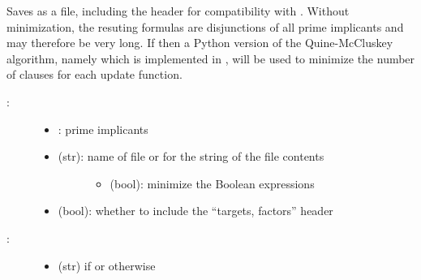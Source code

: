 \documentclass[letterpaper,10pt,english]{sphinxmanual}
\begin{document}
\begin{fulllineitems}
\label{\detokenize{FileExchange:PyBoolNet.FileExchange.primes2bnet}}
Saves  as a  file, including the header  for compatibility with {\hyperref[\detokenize{Installation:installation-boolnet}]{}}.
Without minimization, the resuting formulas are disjunctions of all prime implicants and may therefore be very long.
If  then a Python version of the Quine-McCluskey algorithm,
namely {\hyperref[\detokenize{Bibliography:prekas2012}]{}} which is implemented in {\hyperref[\detokenize{QuineMcCluskey:primes2mindnf}]{}},
will be used to minimize the number of clauses for each update function.
\begin{description}
\item[{:}] \leavevmode\begin{itemize}
\item {} 
: prime implicants

\item {} \begin{description}
\item[{ (str): name of  file or  for the string of the file contents}] \leavevmode\begin{itemize}
\item {} 
 (bool): minimize the Boolean expressions

\end{itemize}

\end{description}

\item {} 
 (bool): whether to include the “targets, factors” header

\end{itemize}

\item[{:}] \leavevmode\begin{itemize}
\item {} 
 (str) if  or  otherwise


\end{itemize}
\end{description}
\end{fulllineitems}
\end{document}
